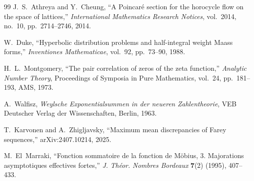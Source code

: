 \documentclass[11pt]{article}
\theoremstyle{definition}
\begin{document}
\begin{thebibliography}{99}
J.~S.~Athreya and Y.~Cheung,
``A Poincar\'e section for the horocycle flow on the space of
lattices,''
\emph{International Mathematics Research Notices},
vol.~2014, no.~10, pp.~2714--2746, 2014.

W.~Duke,
``Hyperbolic distribution problems and half-integral weight Maass forms,''
\emph{Inventiones Mathematicae}, vol.~92, pp.~73--90, 1988.

H.~L.~Montgomery,
``The pair correlation of zeros of the zeta function,''
\emph{Analytic Number Theory}, Proceedings of Symposia in Pure
Mathematics, vol.~24, pp.~181--193, AMS, 1973.

A.~Walfisz,
\emph{Weylsche Exponentialsummen in der neueren Zahlentheorie},
VEB Deutscher Verlag der Wissenschaften, Berlin, 1963.

T.~Karvonen and A.~Zhigljavsky,
``Maximum mean discrepancies of Farey sequences,''
arXiv:2407.10214, 2025.

M.~El~Marraki,
``Fonction sommatoire de la fonction de M\"obius, 3.
Majorations asymptotiques effectives fortes,''
\emph{J. Th\'eor. Nombres Bordeaux} \textbf{7}(2) (1995), 407--433.

\end{thebibliography}
\end{document}
